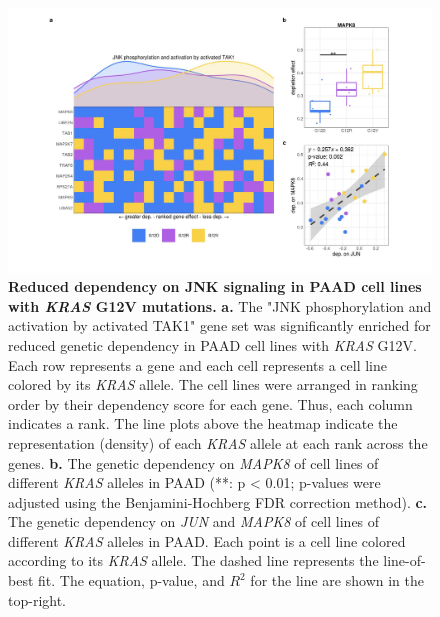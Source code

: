 \documentclass[english, 10pt, letterpaper]{article}
\newcommand{\KRAS}{\emph{KRAS}}
\begin{document}
\begin{figure}[p]
\centering
\includegraphics[width=\textwidth]{figures/Supp_Fig_7.jpeg}
\caption{
    \textbf{Reduced dependency on JNK signaling in PAAD cell lines with \KRAS{} G12V mutations.}
    \textbf{a.} The "JNK phosphorylation and activation by activated TAK1" gene set was significantly enriched for reduced genetic dependency in PAAD cell lines with \KRAS{} G12V. Each row represents a gene and each cell represents a cell line colored by its \KRAS{} allele. The cell lines were arranged in ranking order by their dependency score for each gene. Thus, each column indicates a rank. The line plots above the heatmap indicate the representation (density) of each \KRAS{} allele at each rank across the genes.
    \textbf{b.} The genetic dependency on \emph{MAPK8} of cell lines of different \KRAS{} alleles in PAAD (**: p < 0.01; p-values were adjusted using the Benjamini-Hochberg FDR correction method).
    \textbf{c.} The genetic dependency on \emph{JUN} and \emph{MAPK8} of cell lines of different \KRAS{} alleles in PAAD. Each point is a cell line colored according to its \KRAS{} allele. The dashed line represents the line-of-best fit. The equation, p-value, and $R^2$ for the line are shown in the top-right.
}
\label{sfig:paad-dependency-JUN}
\end{figure}
\end{document}
